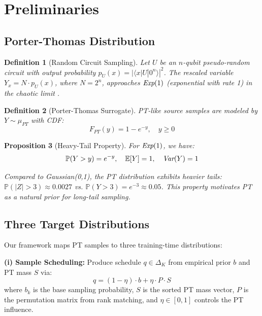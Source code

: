 \documentclass[11pt, a4paper, oneside]{article}
\theoremstyle{plain}
\newtheorem{prop}{Proposition}[section]
\theoremstyle{break}
\theoremstyle{plain}
\theoremstyle{breakdef}
\newtheorem{defi}[prop]{Definition}
\theoremstyle{plain}
\theoremstyle{breakrem}
\theoremstyle{plain}
\theoremstyle{breakrem}
\begin{document}
\section{Preliminaries}
\label{sec:prelim}

\subsection{Porter-Thomas Distribution}

\begin{defi}[Random Circuit Sampling]
Let $U$ be an $n$-qubit pseudo-random circuit with output probability $p_U(x) = |\langle x | U | 0^n \rangle|^2$. The rescaled variable $Y_x = N \cdot p_U(x)$, where $N = 2^n$, approaches $\emph{Exp}(1)$ (exponential with rate 1) in the chaotic limit \cite{arute2019quantum,boixo2017characterizing}.
\end{defi}

\begin{defi}[Porter-Thomas Surrogate]
PT-like source samples are modeled by $Y \sim \mu_{PT}$ with CDF:
\begin{equation}
F_{PT}(y) = 1 - e^{-y}, \quad y \geq 0
\end{equation}
\end{defi}

\begin{prop}[Heavy-Tail Property]
For $\emph{Exp}(1)$, we have:
$$\mathbb{P}(Y > y) = e^{-y}, \quad \mathbb{E}[Y] = 1, \quad \emph{Var}(Y) = 1$$

Compared to Gaussian(0,1), the PT distribution exhibits heavier tails: $\mathbb{P}(|Z| > 3) \approx 0.0027$ vs. $\mathbb{P}(Y > 3) = e^{-3} \approx 0.05$. This property motivates PT as a natural prior for long-tail sampling.
\end{prop}

\subsection{Three Target Distributions}
\label{sec:targets}

Our framework maps PT samples to three training-time distributions:

\textbf{(i) Sample Scheduling:} Produce schedule $q \in \Delta_K$ from empirical prior $b$ and PT mass $S$ via:
\begin{equation}
q = (1 - \eta) \cdot b + \eta \cdot P \cdot S
\label{eq:schedule}
\end{equation}
where $b_k$ is the base sampling probability, $S$ is the sorted PT mass vector, $P$ is the permutation matrix from rank matching, and $\eta \in [0,1]$ controls the PT influence.
\end{document}

